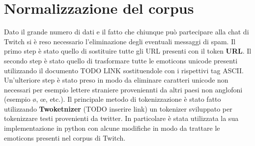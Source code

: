 \documentclass[a4paper,12pt,openright,twoside]{report}
\theoremstyle{definition}
\begin{document}
\section{Normalizzazione del corpus}
Dato il grande numero di dati e il fatto che chiunque può partecipare alla chat di Twitch si è reso necessario l'eliminazione degli eventuali messaggi di spam. Il primo step è stato quello di sostituire tutte gli URL presenti con il token \textbf{URL}. 
Il secondo step è stato quello di trasformare tutte le emoticons unicode presenti utilizzando il documento TODO LINK sostituendole con i rispettivi tag ASCII. Un'ulteriore step è stato preso in modo da eliminare caratteri unicode non necessari per esempio lettere straniere proveniennti da altri paesi non anglofoni (esempio \o, \oe, etc.).
Il principale metodo di tokenizzazione è stato fatto utilizzando \textbf{Twoketnizer} (TODO inserire link) un tokenizer sviluppato per tokenizzare testi provenienti da twitter. In particolare è stata utilizzata la sua implementazione in python con alcune modifiche in modo da trattare le emoticons presenti nel corpus di Twitch.
\end{document}
